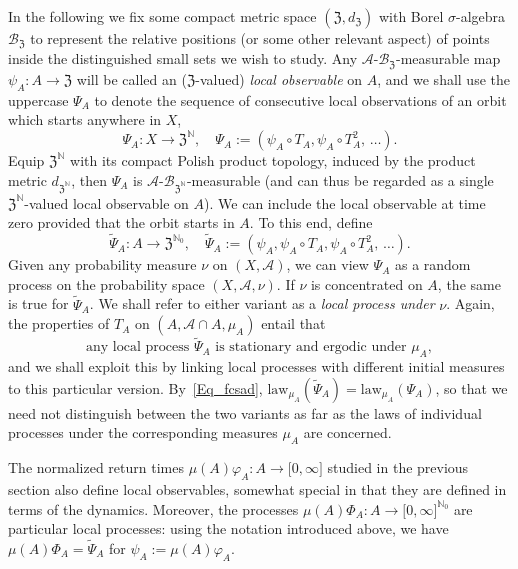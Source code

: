 \documentclass[AHL,Unicode,longabstracts]{cedram}
\newcommand{\clA}{\mathcal{A}}
\newcommand{\clB}{\mathcal{B}}
\newcommand{\law}{\mathrm{law}}
\newcommand{\frkZ}{\mathfrak{Z}}
\newcommand{\bbN}{\mathbb{N}}
\begin{document}
In the following we fix some compact metric space $(\frkZ,d_{\frkZ})$ with Borel $\sigma$-algebra $\clB_{\frkZ}$ to represent the relative positions (or some other relevant aspect) of points inside the distinguished small sets we wish to study. Any $\clA $-$\clB_{\frkZ}$-measurable map $\psi_{A}:A\rightarrow
\frkZ$ will be called an ($\frkZ$-valued) \emph{local observable} on $A$, and we shall use the uppercase $\Psi_{A}$ to denote the sequence of consecutive local observations of an orbit which starts anywhere in $X$,
\begin{equation}\label{Eq_LocProc}
\Psi_{A}:X\rightarrow\frkZ^{\bbN}, \quad\Psi_{A} :=\left(\psi_{A}\circ T_{A},\psi_{A}\circ T_{A}^{2},\,\ldots\right).
\end{equation}
Equip $\frkZ^{\bbN}$ with its compact Polish product topology, induced by the product metric $d_{\frkZ^{\bbN}}$, then $\Psi_{A}$ is $\clA$-$\clB_{\frkZ^{\bbN}}$-measurable (and can thus be regarded as a single $\frkZ^{\bbN}$-valued local observable on $A$). We can include the local observable at time zero provided that the orbit starts in $A$. To this end, define
\begin{equation}
\widetilde{\Psi}_{A}:A\rightarrow\frkZ^{\bbN_{0}}, \quad \widetilde{\Psi}_{A}:=\left(\psi_{A},\psi_{A}\circ T_{A},\psi_{A}\circ T_{A} ^{2},\,\ldots\right).
\end{equation}
Given any probability measure $\nu$ on $(X,\clA)$, we can view $\Psi_{A}$ as a random process on the probability space $(X,\clA,\nu)$. If $\nu$ is concentrated on $A$, the same is true for $\widetilde{\Psi}_{A}$. We shall refer to either variant as a \emph{local process under }$\nu$. Again, the properties of $T_{A}$ on $(A,\clA\cap A,\mu_{A})$ entail that
\begin{equation} \label{Eq_fcsad}
\text{any local process }\widetilde{\Psi}_{A}\text{ is stationary and ergodic under }\mu_{A},
\end{equation}
and we shall exploit this by linking local processes with different initial measures to this particular version. By~\eqref{Eq_fcsad}, $\law _{\mu_{A}}(\widetilde{\Psi}_{A})=\law_{\mu_{A}}(\Psi_{A})$, so that we need not distinguish between the two variants as far as the laws of individual processes under the corresponding measures $\mu_{A}$ are concerned.

\begin{rema}
The normalized return times $\mu(A)\varphi_{A}:A\rightarrow
\lbrack0,\infty]$ studied in the previous section also define local observables, somewhat special in that they are defined in terms of the dynamics. Moreover, the processes $\mu(A)\Phi_{A}:A\rightarrow\lbrack 0,\infty]^{\bbN_{0}}$ are particular local processes: using the notation introduced above, we have $\mu(A)\Phi_{A}=\widetilde{\Psi}_{A}$ for $\psi _{A}:=\mu(A)\varphi_{A}$.
\end{rema}
\end{document}
